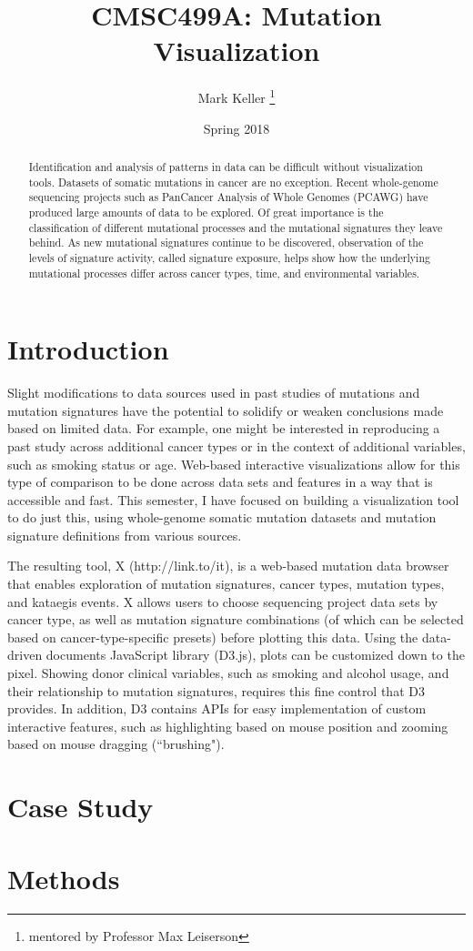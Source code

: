\documentclass[12pt, letterpaper]{article}
\title{CMSC499A: Mutation Visualization}
\author{Mark Keller \thanks{mentored by Professor Max Leiserson}}
\date{Spring 2018}
\begin{document}
\maketitle

\begin{abstract}
Identification and analysis of patterns in data can be difficult without visualization tools. 
Datasets of somatic mutations in cancer are no exception. 
Recent whole-genome sequencing projects such as PanCancer Analysis of Whole Genomes (PCAWG) have produced large amounts of data to be explored.
Of great importance is the classification of different mutational processes and the mutational signatures\cite{alexandrov2013signatures} they leave behind.
As new mutational signatures continue to be discovered, observation of the levels of signature activity, called signature exposure, helps show how the underlying mutational processes differ across cancer types, time, and environmental variables.
\end{abstract}

\section{Introduction}
Slight modifications to data sources used in past studies of mutations and mutation signatures have the potential to solidify or weaken conclusions made based on limited data.
For example, one might be interested in reproducing a past study across additional cancer types or in the context of additional variables, such as smoking status or age.
Web-based interactive visualizations allow for this type of comparison to be done across data sets and features in a way that is accessible and fast.
This semester, I have focused on building a visualization tool to do just this, using whole-genome somatic mutation datasets and mutation signature definitions from various sources.

The resulting tool, X (http://link.to/it), is a web-based mutation data browser that enables exploration of mutation signatures, cancer types, mutation types, and kataegis events.
X allows users to choose sequencing project data sets by cancer type, as well as mutation signature combinations (of which can be selected based on cancer-type-specific presets) before plotting this data. 
Using the data-driven documents JavaScript library (D3.js), plots can be customized down to the pixel.
Showing donor clinical variables, such as smoking and alcohol usage, and their relationship to mutation signatures, requires this fine control that D3 provides.
In addition, D3 contains APIs for easy implementation of custom interactive features, such as highlighting based on mouse position and zooming based on mouse dragging (``brushing"). 

\section{Case Study}

\section{Methods}

{}

\end{document}
